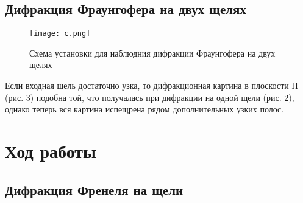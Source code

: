 \documentclass[a4paper]{article}
\begin{document}
\subsection{Дифракция Фраунгофера на двух щелях}

\begin{figure}[h!]
	\centering
	\texttt{[image: c.png]}
	\caption{Схема установки для наблюдния дифракции Фраунгофера на двух щелях}
	\label{labC}
\end{figure}

Если входная щель достаточно узка, то дифракционная картина в плоскости П (рис. 3) подобна той, что получалась при дифракции
на одной щели (рис. 2), однако теперь вся картина испещрена рядом дополнительных узких полос.

\section{Ход работы}
\subsection{Дифракция Френеля на щели}
\end{document}
